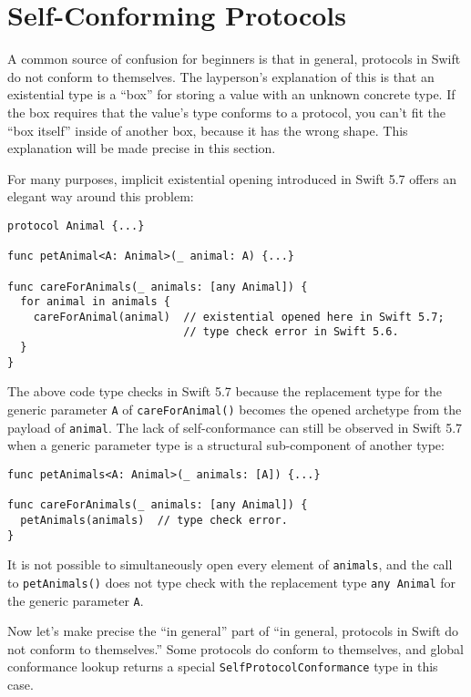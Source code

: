 \documentclass[../generics]{subfiles}
\begin{document}
\fi

\section[]{Self-Conforming Protocols}\label{selfconformingprotocols}

\ifWIP

A common source of confusion for beginners is that in general, protocols in Swift do not conform to themselves. The layperson's explanation of this is that an existential type is a ``box'' for storing a value with an unknown concrete type. If the box requires that the value's type conforms to a protocol, you can't fit the ``box itself'' inside of another box, because it has the wrong shape. This explanation will be made precise in this section.

For many purposes, implicit existential opening introduced in Swift 5.7 \cite{se0352} offers an elegant way around this problem:
\begin{Verbatim}
protocol Animal {...}

func petAnimal<A: Animal>(_ animal: A) {...}

func careForAnimals(_ animals: [any Animal]) {
  for animal in animals {
    careForAnimal(animal)  // existential opened here in Swift 5.7;
                           // type check error in Swift 5.6.
  }
}
\end{Verbatim}
The above code type checks in Swift 5.7 because the replacement type for the generic parameter \texttt{A} of \texttt{careForAnimal()} becomes the opened archetype from the payload of \texttt{animal}. The lack of self-conformance can still be observed in Swift 5.7 when a generic parameter type is a structural sub-component of another type:
\begin{Verbatim}
func petAnimals<A: Animal>(_ animals: [A]) {...}

func careForAnimals(_ animals: [any Animal]) {
  petAnimals(animals)  // type check error.
}
\end{Verbatim}
It is not possible to simultaneously open every element of \texttt{animals}, and the call to \texttt{petAnimals()} does not type check with the replacement type \texttt{any Animal} for the generic parameter \texttt{A}.

Now let's make precise the ``in general'' part of ``in general, protocols in Swift do not conform to themselves.'' Some protocols do conform to themselves, and global conformance lookup returns a special \texttt{SelfProtocolConformance} type in this case.
\end{document}
